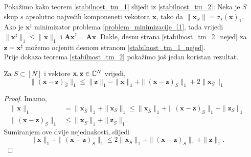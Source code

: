\documentclass[a4paper,twoside,12pt]{memoir} %
\newcommand{\vect}[1]{\mathbf{#1}}
\renewcommand{\vec}{\vect}
\newcommand{\norm}[1]{\|{#1}\|}
\begin{document}
Poka\v{z}imo kako teorem \ref{stabilnost_tm_1} slijedi iz \ref{stabilnost_tm_2}:
Neka je $S$ skup $s$ apsolutno najve\'cih komponeneti vekotora $\vec x$, tako da $\norm{\vec x_{\bar S}}=\sigma_s(\vec x)_1$. Ako je $\vec x^{\sharp}$ minimizator problema \eqref{problem_minimizacije_l1}, tada vrijedi $\norm{\vec x^{\sharp}}_1 \leq \norm{\vec x}_1$ i $\vec{Ax}^{\sharp}= \vec{Ax}$. Dakle, desnu strana \eqref{stabilnost_tm_2_nejed} za $\vec z = \vec x^{\sharp}$ mo\v{z}emo ocjeniti desnom stranom \eqref{stabilnost_tm_1_nejed}.\\
\indent
Prije dokaza teorema \ref{stabilnost_tm_2} poka\v{z}imo jo\v{s} jedan koristan rezultat.
\begin{lem}\label{stabilnost_lema_1}
    Za $S \subset [N]$ i vektore $\vec x, \vec z \in \C^N$ vrijedi,
    \begin{equation*}
        \norm{(\vec x - \vec z)_{\bar S}}_1 \leq \norm{\vec z}_1 - \norm{\vec x}_1 + \norm{(\vec x - \vec z)_S}_1 + 2 \norm{\vec x_{\bar S}}_1
    \end{equation*}
\end{lem}
\begin{proof}
    Imamo,
    \begin{align*}
        \norm{\vec x}_1 &= \norm{\vec x_{\bar S}}_1 + \norm{\vec{x}_S}_1 \leq \norm{\vec x_{\bar S}}_1 + \norm{(\vec x - \vec z)_S}_1 + \norm{\vec z_{S}}_1\\
        \norm{(\vec x - \vec z)_{\bar S}}_1 &\leq \norm{\vec x_{\bar S}}_1 + \norm{\vec z_{\bar S}}_1.
    \end{align*}
    Sumiranjem ove dvije nejednakosti, slijedi
    \begin{equation*}
        \norm{\vec x}_1 + \norm{(\vec x - \vec z)_{\bar S}}_1 \leq 2 \norm{\vec x_{\bar S}}_1 +  \norm{(\vec x - \vec z)_S}_1 + \norm{\vec z}_1.
    \end{equation*}
\end{proof}
\end{document}
